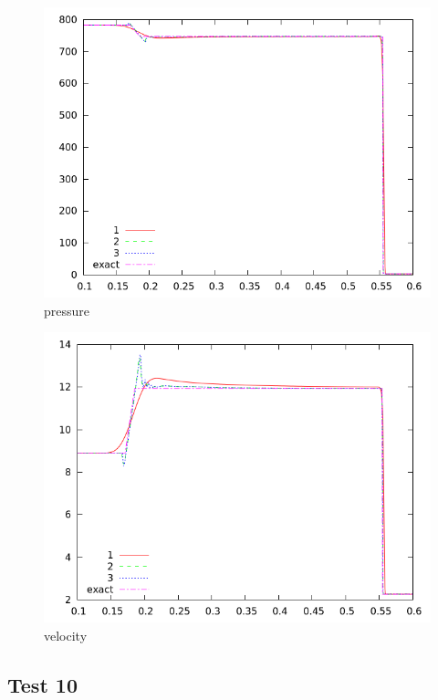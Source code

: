 \documentclass[letterpaper,12pt]{article}
\begin{document}
\begin{figure}
  \begin{center}
     \includegraphics[width=.78\textwidth]{prs_T9.png}	
  \end{center}
  \caption{pressure}
\end{figure}

\begin{figure}
  \begin{center}
     \includegraphics[width=.78\textwidth]{vel_T9.png}	
  \end{center}
  \caption{velocity}
\end{figure}
\clearpage

\subsection{Test 10}
\end{document}
